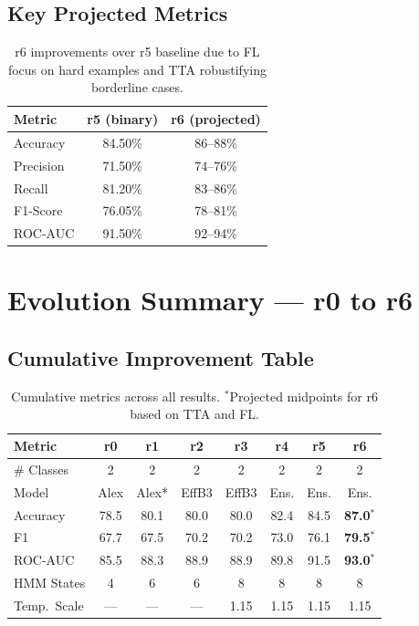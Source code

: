 \documentclass[12pt,a4paper]{article}
\begin{document}
\subsection{Key Projected Metrics}
\begin{table}[H]\centering
\begin{tabular}{lcc}
\toprule
\textbf{Metric} & \textbf{r5 (binary)} & \textbf{r6 (projected)} \\
\midrule
Accuracy          & 84.50\% & 86--88\% \\
Precision         & 71.50\% & 74--76\% \\
Recall            & 81.20\% & 83--86\% \\
F1-Score          & 76.05\% & 78--81\% \\
ROC-AUC           & 91.50\% & 92--94\% \\
\bottomrule
\end{tabular}
\caption{r6 improvements over r5 baseline due to FL focus on hard examples and TTA robustifying borderline cases.}
\end{table}

\newpage
\section{Evolution Summary --- r0 to r6}

\subsection{Cumulative Improvement Table}

\begin{table}[H]\centering\small
\begin{tabular}{lccccccc}
\toprule
\textbf{Metric} & \textbf{r0} & \textbf{r1} & \textbf{r2} & \textbf{r3} & \textbf{r4} & \textbf{r5} & \textbf{r6} \\
\midrule
\# Classes     & 2     & 2     & 2     & 2     & 2     & 2     & 2 \\
Model          & Alex  & Alex* & EffB3 & EffB3 & Ens.  & Ens.  & Ens. \\
Accuracy       & 78.5  & 80.1  & 80.0  & 80.0  & 82.4  & 84.5  & \textbf{87.0$^*$} \\
F1             & 67.7  & 67.5  & 70.2  & 70.2  & 73.0  & 76.1  & \textbf{79.5$^*$} \\
ROC-AUC        & 85.5  & 88.3  & 88.9  & 88.9  & 89.8  & 91.5  & \textbf{93.0$^*$} \\
HMM States     & 4     & 6     & 6     & 8     & 8     & 8     & 8 \\
Temp.\ Scale   & ---   & ---   & ---   & 1.15  & 1.15  & 1.15  & 1.15 \\
\bottomrule
\end{tabular}
\caption{Cumulative metrics across all results. $^*$Projected midpoints for r6 based on TTA and FL.}
\end{table}
\end{document}
